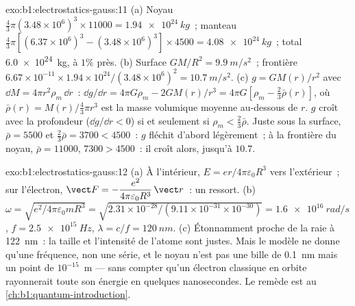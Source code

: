 \begin{solution}{exo:b1:electrostatics-gauss:11}
(a) Noyau $\tfrac43\pi(3.48 \times 10^6)^3 \times 11000 = \qty{1.94e24}{kg}$~; manteau
$\tfrac43\pi[(6.37 \times 10^6)^3 - (3.48 \times 10^6)^3] \times 4500 = \qty{4.08e24}{kg}$~;
total \qty{6.0e24}{kg}, à $1\%$ près. (b) Surface $GM/R^2 = \qty{9.9}{m/s^2}$~;
frontière $6.67 \times 10^{-11} \times 1.94 \times 10^{24}/(3.48 \times 10^6)^2 =
\qty{10.7}{m/s^2}$. (c) $g = GM(r)/r^2$ avec $\dd M = 4\pi r^2\rho_m\,\dd r$~:
$\dd g/\dd r = 4\pi G\rho_m - 2GM(r)/r^3 = 4\pi G[\rho_m - \tfrac23\bar\rho(r)]$,
où $\bar\rho(r) = M(r)/\tfrac43\pi r^3$ est la masse volumique moyenne au-dessous de $r$.
$g$ croît avec la profondeur ($\dd g/\dd r < 0$) si et seulement si $\rho_m < \tfrac23\bar\rho$. Juste
sous la surface, $\bar\rho = 5500$ et $\tfrac23\bar\rho = 3700 < 4500$~: $g$
fléchit d'abord légèrement~; à la frontière du noyau, $\bar\rho = 11000$, $7300 >
4500$~: il croît alors, jusqu'à $10.7$.
\end{solution}

\begin{solution}{exo:b1:electrostatics-gauss:12}
(a) À l'intérieur, $E = er/4\pi\varepsilon_0R^3$ vers l'extérieur~; sur l'électron, $\vect F =
-\dfrac{e^2}{4\pi\varepsilon_0R^3}\,\vect r$~: un ressort. (b) $\omega = \sqrt{e^2/4\pi\varepsilon_0mR^3}
= \sqrt{2.31 \times 10^{-28}/(9.11 \times 10^{-31} \times 10^{-30})} = \qty{1.6e16}{rad/s}$,
$f = \qty{2.5e15}{Hz}$, $\lambda = c/f = \qty{120}{nm}$. (c) Étonnamment proche
de la raie à \qty{122}{nm}~: la taille et l'intensité de l'atome sont justes.
Mais le modèle ne donne qu'une fréquence, non une série, et le noyau n'est pas
une bille de \qty{0.1}{nm} mais un point de $10^{-15}$~m --- sans compter qu'un
électron classique en orbite rayonnerait toute son énergie en quelques
nanosecondes. Le remède est au \cref{ch:b1:quantum-introduction}.
\end{solution}

